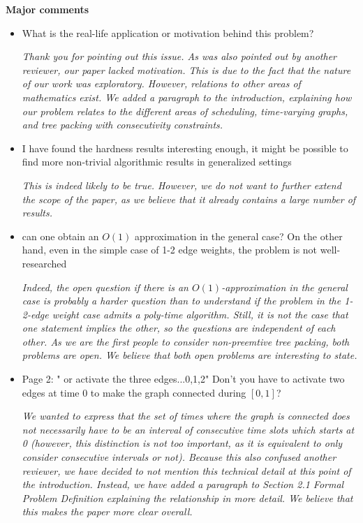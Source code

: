 \documentclass[11pt,a4paper]{article}
\begin{document}
\textbf{Major comments}
\begin{itemize}

\item What is the real-life application or motivation behind this problem? 

\textit{Thank you for pointing out this issue. As was also pointed out by another reviewer, our paper lacked motivation. This is due to the fact that the nature of our work was exploratory. However, relations to other areas of mathematics exist. We added a paragraph to the introduction, explaining how our problem relates to the different areas of scheduling, time-varying graphs, and tree packing with consecutivity constraints.}

\item I have found the hardness results interesting enough, it might be possible to find more non-trivial algorithmic results in generalized settings 

\textit{This is indeed likely to be true. However, we do not want to further extend the scope of the paper, as we believe that it already contains a large number of results.}

\item can one obtain an $O(1)$ approximation in the general case? On the other hand, even in the simple case of 1-2 edge weights, the problem is not well-researched

\textit{Indeed, the open question if there is an $O(1)$-approximation in the general case is probably a harder question than to understand if the problem in the 1-2-edge weight case admits a poly-time algorithm. Still, it is not the case that one statement implies the other, so the questions are independent of each other. As we are the first people to consider non-preemtive tree packing, both problems are open. We believe that both open problems are interesting to state.}


 
\item Page 2: " or activate the three edges...0,1,2" Don't you have to activate two edges at time 0 to make the graph connected during $[0,1]$?

\textit{We wanted to express that the set of times where the graph is connected does not necessarily have to be an interval of consecutive time slots which starts at 0 (however, this distinction is not too important, as it is equivalent to only consider consecutive intervals or not). Because this also confused another reviewer, we have decided to not mention this technical detail at this point of the introduction. Instead, we have added a paragraph to Section 2.1 Formal Problem Definition explaining the relationship in more detail. We believe that this makes the paper more clear overall.}


\end{itemize}
\end{document}
